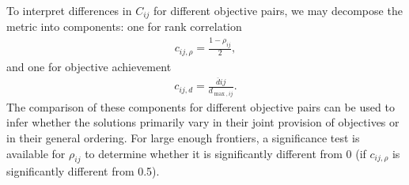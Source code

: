To interpret differences in $C_{ij}$ for different objective pairs, we may decompose the metric into components: one for rank correlation
\begin{align}
c_{ij,\rho} = \frac{1-\rho_{ij}}{2},
\end{align}
and one for objective achievement
\begin{align}
c_{ij,d} = \frac{\overbar{d}{ij}}{d_{\max,ij}}.
\end{align}
The comparison of these components for different objective pairs can be used to infer whether the solutions primarily vary in their joint provision of objectives or in their general ordering. For large enough frontiers, a significance test is available for $\rho_{ij}$ to determine whether it is significantly different from 0 (if $c_{ij,\rho}$ is significantly different from 0.5).